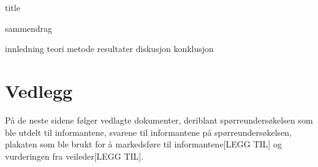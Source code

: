 



{title}
\newpage

\cleardoublepage
\tableofcontents
\newpage

{sammendrag}


{innledning}
{teori}
{metode}
{resultater}
{diskusjon}
{konklusjon}

\newpage

\printbibliography[heading=bibintoc]
\listoffigures

\section*{Vedlegg}
På de neste sidene følger vedlagte dokumenter, deriblant spørreundersøkelsen som ble utdelt til informantene, svarene til informantene på spørreundersøkelsen, plakaten som ble brukt for å markedsføre til informantene[LEGG TIL] og vurderingen fra veileder[LEGG TIL]. 


 



